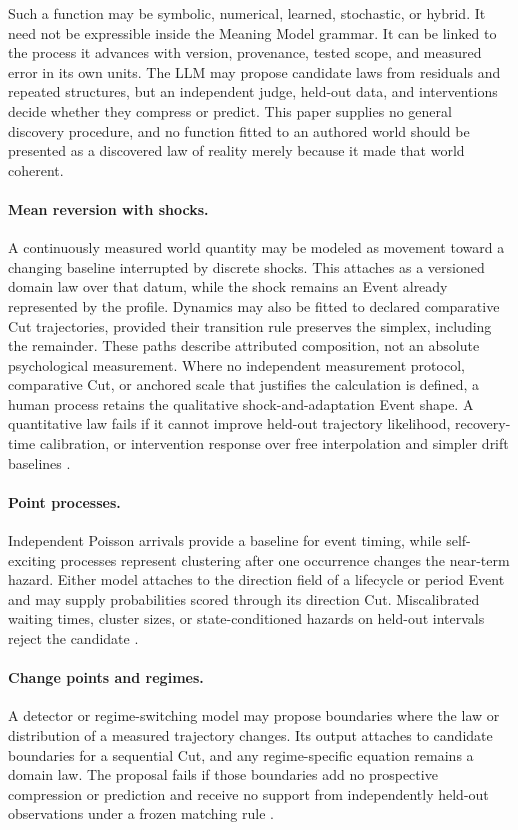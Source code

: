 \documentclass[10pt]{article}
\begin{document}
Such a function may be symbolic, numerical, learned, stochastic, or hybrid.
It need not be expressible inside the Meaning Model grammar. It can be linked
to the process it advances with version, provenance, tested scope, and measured
error in its own units.
The LLM may propose candidate laws from residuals and repeated structures, but
an independent judge, held-out data, and interventions decide whether they
compress or predict. This paper supplies no general discovery procedure, and no
function fitted to an authored world should be presented as a discovered law of reality
merely because it made that world coherent.

\paragraph{Mean reversion with shocks.}
A continuously measured world quantity may be modeled as movement toward a
changing baseline interrupted by discrete shocks. This attaches as a versioned
domain law over that datum, while the shock remains an Event already represented
by the profile. Dynamics may
also be fitted to declared comparative Cut trajectories, provided their
transition rule preserves the simplex, including the remainder. These paths
describe attributed composition, not an absolute psychological measurement.
Where no independent measurement protocol, comparative Cut, or anchored scale
that justifies the calculation is defined, a human process retains the
qualitative shock-and-adaptation Event shape. A quantitative law fails if it
cannot improve held-out trajectory likelihood, recovery-time calibration, or
intervention response over free interpolation and simpler drift baselines
\cite{uhlenbeckOrnstein1930,merton1976jump}.

\paragraph{Point processes.}
Independent Poisson arrivals provide a baseline for event timing, while
self-exciting processes represent clustering after one occurrence changes the
near-term hazard. Either model attaches to the direction field of a lifecycle
or period Event and may supply probabilities scored through its direction Cut. Miscalibrated waiting times, cluster sizes, or
state-conditioned hazards on held-out intervals reject the candidate
\cite{hawkes1971,meiEisner2017}.

\paragraph{Change points and regimes.}
A detector or regime-switching model may propose boundaries where the law or
distribution of a measured trajectory changes. Its output attaches to candidate
boundaries for a sequential Cut, and any regime-specific equation remains a domain law. The proposal fails if those
boundaries add no prospective compression or prediction and receive no support
from independently held-out observations under a frozen matching rule
\cite{killick2012changepoints,goebel2009hybrid}.
\end{document}
